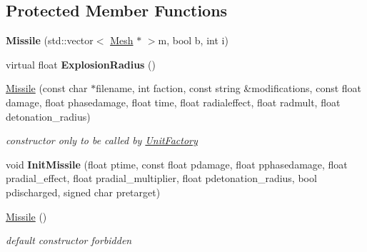 \subsection*{Protected Member Functions}
\begin{DoxyCompactItemize}
\item 
{\bfseries Missile} (std\+::vector$<$ \hyperlink{classMesh}{Mesh} $\ast$ $>$m, bool b, int i)\hypertarget{classMissile_a191b38af3f6b87211492271b58dfb080}{}\label{classMissile_a191b38af3f6b87211492271b58dfb080}

\item 
virtual float {\bfseries Explosion\+Radius} ()\hypertarget{classMissile_af711385bdb2f8b4e638c223e8936e90c}{}\label{classMissile_af711385bdb2f8b4e638c223e8936e90c}

\item 
\hyperlink{classMissile_accc89835fd62c418ee6af881287fc781}{Missile} (const char $\ast$filename, int faction, const string \&modifications, const float damage, float phasedamage, float time, float radialeffect, float radmult, float detonation\+\_\+radius)\hypertarget{classMissile_accc89835fd62c418ee6af881287fc781}{}\label{classMissile_accc89835fd62c418ee6af881287fc781}

\begin{DoxyCompactList}\small\item\em constructor only to be called by \hyperlink{classUnitFactory}{Unit\+Factory} \end{DoxyCompactList}\item 
void {\bfseries Init\+Missile} (float ptime, const float pdamage, float pphasedamage, float pradial\+\_\+effect, float pradial\+\_\+multiplier, float pdetonation\+\_\+radius, bool pdischarged, signed char pretarget)\hypertarget{classMissile_a62cb8b72decaef5ccec45554baa97c56}{}\label{classMissile_a62cb8b72decaef5ccec45554baa97c56}

\item 
\hyperlink{classMissile_aa5ce8791a8e7ebd4ea0afab390b73a1a}{Missile} ()\hypertarget{classMissile_aa5ce8791a8e7ebd4ea0afab390b73a1a}{}\label{classMissile_aa5ce8791a8e7ebd4ea0afab390b73a1a}

\begin{DoxyCompactList}\small\item\em default constructor forbidden \end{DoxyCompactList}\end{DoxyCompactItemize}
